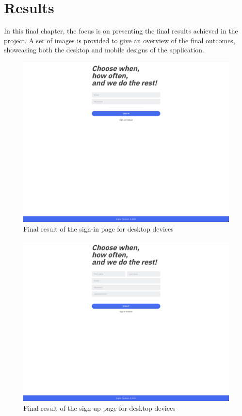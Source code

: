 \documentclass[./memory.tex]{subfiles}
\begin{document}
\chapter{Results}
In this final chapter, the focus is on presenting the final results achieved in
the project. A set of images is provided to give an overview of the final
outcomes, showcasing both the desktop and mobile designs of the application.
\begin{figure}[H]
	\centering
	\includegraphics[width=\textwidth]{./assets/results/desktop-sign-in.png}
	\caption{Final result of the sign-in page for desktop devices}
\end{figure}
\begin{figure}[H]
	\centering
	\includegraphics[width=\textwidth]{./assets/results/desktop-sign-up.png}
	\caption{Final result of the sign-up page for desktop devices}
\end{figure}
\end{document}
